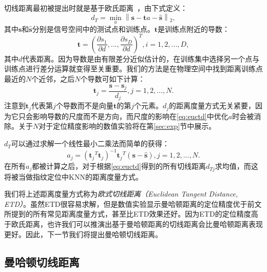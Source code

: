 切线距离最初被提出时就是基于欧氏距离~\cite{simard1998transformation}，由下式定义：
\begin{equation}
d_T = \mathop {\min }\limits_{a} {{\left\| \mathbf{s} - \mathbf{t}a - \widehat{\mathbf{s}} \right\|}_2}, \label{eq:euctd}
\end{equation}
其中$\mathbf{s}$和$\widehat{\mathbf{s}}$分别是信号空间中的测试点和训练点。$\mathbf{t}$是训练点附近的导数：
\begin{equation}
\mathbf{t} = {\left( \frac{\partial s_1}{\partial d}, ..., \frac{\partial s_D}{\partial d} \right)}^T, i = 1, 2, ..., D,
\end{equation}
其中$d$代表距离。因为导数是由有限差分近似估计的，在训练集中选择另一个点与训练点进行差分运算就变得至关重要。我们的方法是在物理空间中找到距离训练点最近的$N$个近邻，之后$N$个导数可如下计算：
\begin{equation}
\mathbf{t}_j = \frac{\mathbf{s} - \mathbf{s}_j}{d_j}, j = 1, 2, ..., N.
\end{equation}
注意到$\mathbf{t}_j$代表第$j$个导数而不是向量$\mathbf{t}$的第$j$个元素。$d_j$的距离度量方式无关紧要，因为它只会影响导数的尺度而不是方向，而尺度的影响在\eqref{eq:euctd}中优化$a$时会被消除。关于$N$对于定位精度影响的数值实验将在第\ref{sec:exp}节中展示。

$d_T$可以通过求解一个线性最小二乘法而简单的获得：
\begin{equation}
a_j = {\left( {\mathbf{t}_j}^T\mathbf{t}_j \right)}^{-1}{\mathbf{t}_j}^T\left( {\mathbf{s}} - \widehat{\mathbf{s}} \right), j = 1, 2, ..., N. \label{eq:euca}
\end{equation}
在所有$a_j$都被计算之后，对于根据\eqref{eq:euctd}得到的所有切线距离$d_{Tj}$求均值，而这将被当做指纹定位中KNN的距离度量方式。

我们将上述距离度量方式称为\textit{欧式切线距离（Euclidean Tangent Distance, ETD）}。虽然ETD很容易求解，但是数值实验显示曼哈顿距离的定位精度优于前文所提到的所有常见距离度量方式，甚至比ETD效果还好。因为ETD的定位精度高于欧氏距离，也许我们可以推演出基于曼哈顿距离的切线距离会比曼哈顿距离表现更好。因此，下一节我们将提出曼哈顿切线距离。

\subsection{曼哈顿切线距离}

